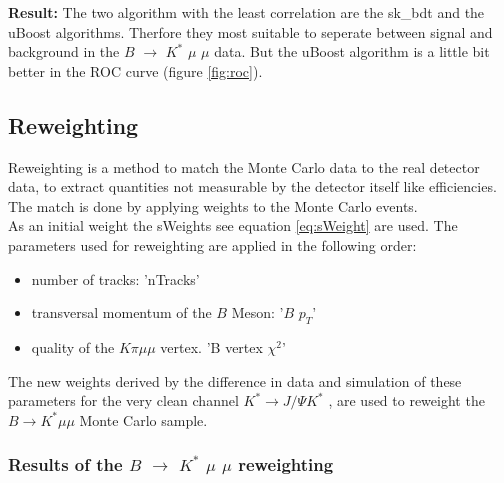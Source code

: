\documentclass[english]{uzhpub}
\begin{document}
 \textbf{Result:} The two algorithm with the least correlation are the sk\_bdt and the uBoost algorithms. Therfore they most suitable to seperate between signal and background in the $B$ $\rightarrow$ $K^{*}$ $\mu$ $\mu$ data. But the uBoost algorithm is a little bit better in the ROC curve (figure \ref{fig:roc}).



 \subsection{Reweighting} \label{sec:Reweight}


Reweighting is a method to match the Monte Carlo data to the real detector data, to extract quantities not measurable by the detector itself like efficiencies. The match is done by applying weights to the Monte Carlo events. \\
As an initial weight the sWeights see equation \ref{eq:sWeight} are used. The parameters used for reweighting are applied in the following order:
\begin{itemize}
  \item number of tracks: 'nTracks'
  \item transversal momentum of the $B$ Meson: '$B$ $p_T$'
  \item quality of the $K \pi \mu \mu$ vertex. 'B vertex $\chi^2$'
\end{itemize}
The new weights derived by the difference in data and simulation of these parameters for the very clean channel $K^* \rightarrow J/ \Psi K^{*}$ \cite{bib:JPsi}, are used to reweight the $B \rightarrow K^* \mu \mu$ Monte Carlo sample.

\subsubsection{Results of the $B$ $\rightarrow$ $K^{*}$ $\mu$ $\mu$ reweighting}
\end{document}
